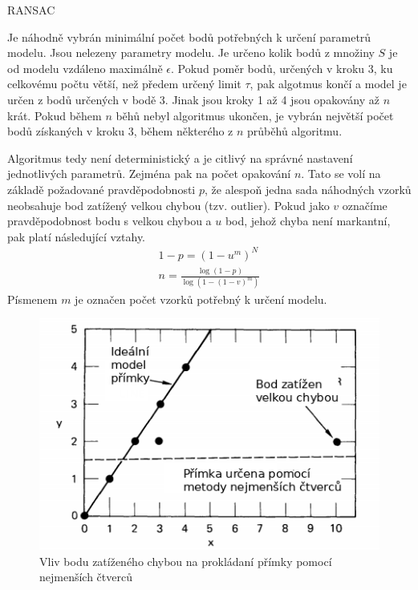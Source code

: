 \documentclass[twoside]{ctuthesis}
\begin{document}
\begin{algorithm}
    \caption{RANSAC}
    \label{alg:RANSAC}
    \begin{algorithmic}[1]
        \STATE Je náhodně vybrán minimální počet bodů potřebných k určení parametrů modelu.
        \STATE Jsou nelezeny parametry modelu.
        \STATE Je určeno kolik bodů z množiny $S$ je od modelu vzdáleno maximálně $\epsilon$. 
        \STATE Pokud poměr bodů, určených v kroku 3, ku celkovému počtu větší, než předem určený limit $\tau$, pak algotmus končí a model je určen z bodů určených v bodě 3.
        \STATE Jinak jsou kroky 1 až 4 jsou opakovány až $n$ krát.
        \STATE Pokud během $n$ běhů nebyl algoritmus ukončen, je vybrán největší počet bodů získaných v kroku 3, během některého z $n$ průběhů algoritmu.
    \end{algorithmic}
\end{algorithm}

Algoritmus tedy není deterministický a je citlivý na správné nastavení jednotlivých parametrů. Zejména pak na počet opakování $n$. Tato se volí na základě požadované pravděpodobnosti $p$, že alespoň jedna sada náhodných vzorků neobsahuje bod zatížený velkou chybou (tzv. outlier). Pokud jako $v$ označíme pravděpodobnost bodu s velkou chybou a $u$ bod, jehož chyba není markantní, pak platí následující vztahy. \cite{fischler1981random}
\begin{align}
    1 - p = (1 - u^m)^N \\
    n = \frac{\log(1 - p)}{\log(1 - (1 - v)^m)}
\end{align}
Písmenem $m$ je označen počet vzorků potřebný k určení modelu. 



\begin{figure}
    \centering
    \includegraphics[width = 0.9 \linewidth]{pictures/ransac_least_squares.png}
    \caption{Vliv bodu zatíženého chybou na prokládaní přímky pomocí nejmenších čtverců \cite{fischler1981random}}
    \label{fig:least_squares_error}
\end{figure}
\end{document}
